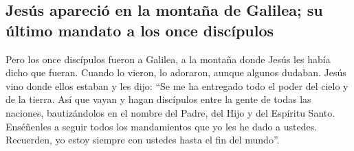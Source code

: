 \hypertarget{jesuxfas-apareciuxf3-en-la-montauxf1a-de-galilea-su-uxfaltimo-mandato-a-los-once-discuxedpulos}{%
\subsection{Jesús apareció en la montaña de Galilea; su último mandato a
los once
discípulos}\label{jesuxfas-apareciuxf3-en-la-montauxf1a-de-galilea-su-uxfaltimo-mandato-a-los-once-discuxedpulos}}

 Pero los once discípulos fueron a Galilea, a la montaña
donde Jesús les había dicho que fueran.  Cuando lo
vieron, lo adoraron, aunque algunos dudaban.  Jesús vino
donde ellos estaban y les dijo: ``Se me ha entregado todo el poder del
cielo y de la tierra.  Así que vayan y hagan discípulos
entre la gente de todas las naciones, bautizándolos en el nombre del
Padre, del Hijo y del Espíritu Santo.  Enséñenles a
seguir todos los mandamientos que yo les he dado a ustedes. Recuerden,
yo estoy siempre con ustedes hasta el fin del mundo''.
